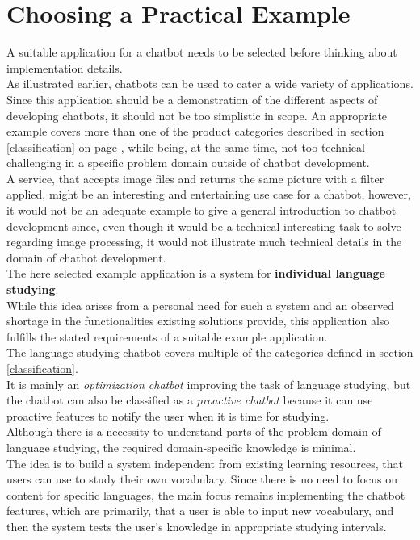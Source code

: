 \section{Choosing a Practical Example}


A suitable application for a chatbot needs to be selected before thinking about implementation details.
\\
As illustrated earlier, chatbots can be used to cater a wide variety of applications.
\\

Since this application should be a demonstration of the different aspects of developing chatbots,
it should not be too simplistic in scope.
An appropriate example covers more than one of the product categories described in section \ref{classification} on page \pageref{classification},
while being, at the same time, not too technical challenging in a specific  problem domain outside of chatbot development.
\\
A service, that accepts image files and returns the same picture with a filter applied,
might be an interesting and entertaining use case for a chatbot,
however, it would not be an adequate example to give a general introduction to chatbot development since,
even though it would be a technical interesting task to solve regarding image processing,
it would not illustrate much technical details in the domain of chatbot development.
\\

The here selected example application is a system for \textbf{individual language studying}.
\\
While this idea arises from a personal need for such a system and an observed shortage in the functionalities existing solutions provide,
this application also fulfills the stated requirements of a suitable example application.
\\

The language studying chatbot covers multiple of the categories defined in section \ref{classification}.
\\
It is mainly an \emph{optimization chatbot} improving the task of language studying,
but the chatbot can also be classified as a \emph{proactive chatbot} because it can use proactive features to notify the user when it is time for studying.
\\

Although there is a necessity to understand parts of the problem domain of language studying,
the required domain-specific knowledge is minimal.
\\

The idea is to build a system independent from existing learning resources, that users can use to study their own vocabulary.
Since there is no need to focus on content for specific languages, the main focus remains implementing the chatbot features,
which are primarily, that a user is able to input new vocabulary, and then the system tests the user's knowledge in appropriate studying intervals.
